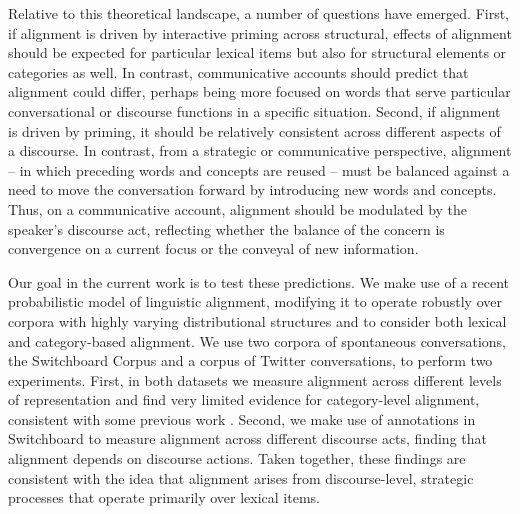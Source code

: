 \documentclass[11pt]{article}
\begin{document}
Relative to this theoretical landscape, a number of questions have emerged. First, if alignment is driven by interactive priming across structural, effects of alignment should be expected for particular lexical items but also for structural elements or categories as well. In contrast, communicative accounts should predict that alignment could differ, perhaps being more focused on words that serve particular conversational or discourse functions in a specific situation. Second, if alignment is driven by priming, it should be relatively consistent across different aspects of a discourse. In contrast, from a strategic or communicative perspective, alignment -- in which preceding words and concepts are reused -- must be balanced against a need to move the conversation forward by introducing new words and concepts. Thus, on a communicative account, alignment should be modulated by the speaker's discourse act, reflecting whether the balance of the concern is convergence on a current focus or the conveyal of new information.

Our goal in the current work is to test these predictions. We make use of a recent probabilistic model of linguistic alignment, modifying it to operate robustly over corpora with highly varying distributional structures and to consider both lexical and category-based alignment. We use two corpora of spontaneous conversations, the Switchboard Corpus and a corpus of Twitter conversations, to perform two experiments. First, in both datasets we measure alignment across different levels of representation and find very limited evidence for category-level alignment, consistent with some previous work \cite{HealeyPurverHowes2014}.  Second, we make use of annotations in Switchboard to measure alignment across different discourse acts, finding that alignment depends on discourse actions. Taken together, these findings are consistent with the idea that alignment arises from discourse-level, strategic processes that operate primarily over lexical items.



%
%

\end{document}
